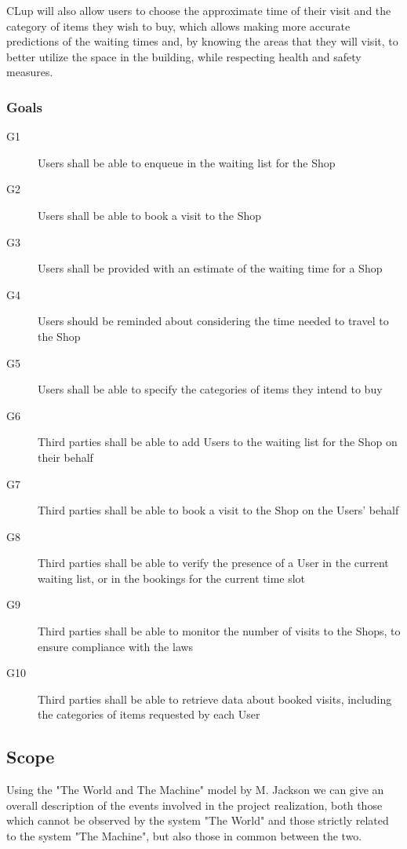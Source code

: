 CLup will also allow users to choose the approximate time of their visit and the category of items they wish to buy, which allows making more accurate predictions of the waiting times and, by knowing the areas that they will visit, to better utilize the space in the building, while respecting health and safety measures.

\subsubsection{Goals}

\begin{description}
    \item [G1]  Users shall be able to enqueue in the waiting list for the Shop
    \item [G2]  Users shall be able to book a visit to the Shop
    \item [G3]  Users shall be provided with an estimate of the waiting time for a Shop
    \item [G4]  Users should be reminded about considering the time needed to travel to the Shop
    \item [G5]  Users shall be able to specify the categories of items they intend to buy 
    
    \item [G6]  Third parties shall be able to add Users to the waiting list for the Shop on their behalf
    \item [G7]  Third parties shall be able to book a visit to the Shop on the Users' behalf
    \item [G8]  Third parties shall be able to verify the presence of a User in the current waiting list, or in the bookings for the current time slot
    \item [G9]  Third parties shall be able to monitor the number of visits to the Shops, to ensure compliance with the laws
    \item [G10] Third parties shall be able to retrieve data about booked visits, including the categories of items requested by each User 
    
\end{description}
\subsection{Scope}

Using the "The World and The Machine" model by M. Jackson we can give an overall description of the events involved in the project realization, both those which cannot be observed by the system "The World" and those strictly related to the system "The Machine", but also those in common between the two.

